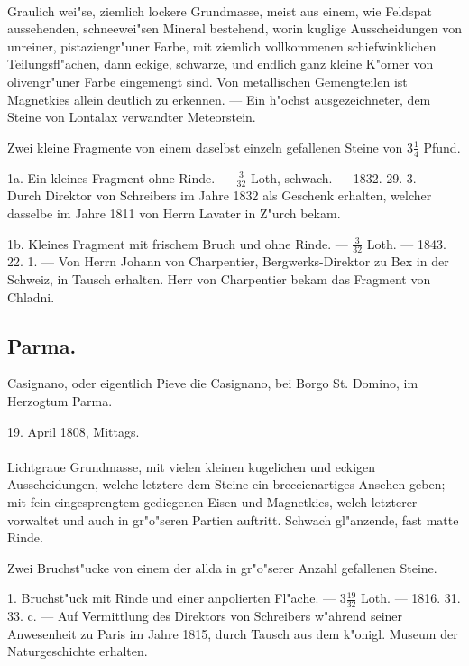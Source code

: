 \documentclass[a4paper, 11pt, oneside, polutonikogreek, german]{article}
\begin{document}
\paragraph{}
Graulich wei"se, ziemlich lockere Grundmasse, meist aus einem, wie Feldspat aussehenden, schneewei"sen Mineral bestehend‚ worin kuglige Ausscheidungen von unreiner, pistaziengr"uner Farbe, mit ziemlich vollkommenen schiefwinklichen Teilungsfl"achen, dann eckige, schwarze, und endlich ganz kleine K"orner von olivengr"uner Farbe eingemengt sind. Von metallischen Gemengteilen ist Magnetkies allein deutlich zu erkennen. --- Ein h"ochst ausgezeichneter, dem Steine von Lontalax verwandter Meteorstein.

Zwei kleine Fragmente von einem daselbst einzeln gefallenen Steine von $3\frac{1}{4}$ Pfund.

1a. Ein kleines Fragment ohne Rinde. --- $\frac{3}{32}$ Loth, schwach. --- 1832. 29. 3. --- Durch Direktor von Schreibers im Jahre 1832 als Geschenk erhalten, welcher dasselbe im Jahre 1811 von Herrn Lavater in Z"urch bekam.

1b. Kleines Fragment mit frischem Bruch und ohne Rinde. --- $\frac{3}{32}$ Loth. --- 1843. 22. 1. --- Von Herrn Johann von Charpentier, Bergwerks-Direktor zu Bex in der Schweiz, in Tausch erhalten. Herr von Charpentier bekam das Fragment von Chladni.
\subsection{Parma.}
\begin{center}
\small
Casignano, oder eigentlich Pieve die Casignano, bei Borgo St. Domino, im Herzogtum Parma.

19. April 1808, Mittags.
\end{center}
\paragraph{}
Lichtgraue Grundmasse, mit vielen kleinen kugelichen und eckigen Ausscheidungen, welche letztere dem Steine ein breccienartiges Ansehen geben; mit fein eingesprengtem gediegenen Eisen und Magnetkies, welch letzterer vorwaltet und auch in gr"o"seren Partien auftritt. Schwach gl"anzende, fast matte Rinde.

Zwei Bruchst"ucke von einem der allda in gr"o"serer Anzahl gefallenen Steine.

1. Bruchst"uck mit Rinde und einer anpolierten Fl"ache. --- $3\frac{19}{32}$ Loth. --- 1816. 31. 33. c. --- Auf Vermittlung des Direktors von Schreibers w"ahrend seiner Anwesenheit zu Paris im Jahre 1815, durch Tausch aus dem k"onigl. Museum der Naturgeschichte erhalten.
\end{document}
